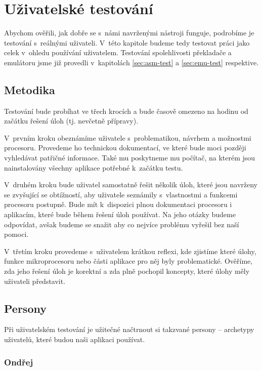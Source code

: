 \chapter{Uživatelské testování}

Abychom ověřili, jak dobře se s~námi navrženými nástroji funguje, podrobíme je testování s~reálnými uživateli. V~této kapitole budeme tedy testovat práci jako celek v~ohledu používání uživatelem. Testování spolehlivosti překladače a emulátoru jsme již provedli v~kapitolách \ref{sec:asm-test} a \ref{sec:emu-test} respektive.

\section{Metodika}

Testování bude probíhat ve třech krocích a bude časově omezeno na hodinu od začátku řešení úloh (tj. nevčetně přípravy).

V~prvním kroku obeznámíme uživatele s~problematikou, návrhem a možnostmi procesoru. Provedeme ho technickou dokumentací, ve které bude moci později vyhledávat patřičné informace. Také mu poskytneme mu počítač, na kterém jsou nainstalovány všechny aplikace potřebné k~začátku testu.

V~druhém kroku bude uživatel samostatně řešit několik úloh, které jsou navrženy se zvyšující se obtížností, aby uživatele seznámily s~vlastnostmi a funkcemi procesoru postupně. Bude mít k~dispozici plnou dokumentaci procesoru i aplikacím, které bude během řešení úloh používat. Na jeho otázky budeme odpovídat, avšak budeme se snažit aby co nejvíce problému vyřešil bez naší pomoci.

V~třetím kroku provedeme s~uživatelem krátkou reflexi, kde zjistíme které úlohy, funkce mikroprocesoru nebo části aplikace pro něj byly problematické. Ověříme, zda jeho řešení úloh je korektní a zda plně pochopil koncepty, které úlohy měly uživateli představit.

\section{Persony}

Při uživatelském testování je užitečné načtrnout si takzvané persony -- archetypy uživatelů, které budou naši aplikaci používat.

\subsection{Ondřej}
\label{persona:a}

